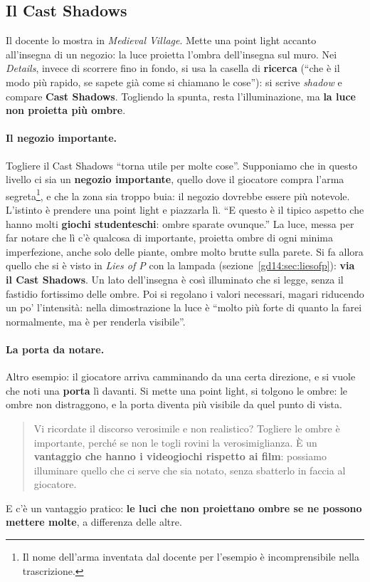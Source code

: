\subsection{Il Cast Shadows}

Il docente lo mostra in \emph{Medieval Village}. Mette una point light accanto
all'insegna di un negozio: la luce proietta l'ombra dell'insegna sul muro. Nei
\emph{Details}, invece di scorrere fino in fondo, si usa la casella di
\textbf{ricerca} (``che è il modo più rapido, se sapete già come si chiamano le
cose''): si scrive \emph{shadow} e compare \textbf{Cast Shadows}. Togliendo la
spunta, resta l'illuminazione, ma \textbf{la luce non proietta più ombre}.

\paragraph{Il negozio importante.} Togliere il Cast Shadows ``torna utile per molte
cose''. Supponiamo che in questo livello ci sia un \textbf{negozio importante}, quello
dove il giocatore compra l'arma segreta\footnote{Il nome dell'arma inventata dal
docente per l'esempio è incomprensibile nella trascrizione.}, e che la zona sia
troppo buia: il negozio dovrebbe essere più notevole. L'istinto è prendere una point
light e piazzarla lì. ``E questo è il tipico aspetto che hanno molti \textbf{giochi
studenteschi}: ombre sparate ovunque.'' La luce, messa per far notare che lì c'è
qualcosa di importante, proietta ombre di ogni minima imperfezione, anche solo
delle piante, ombre molto brutte sulla parete. Si fa allora quello che si è visto in
\emph{Lies of P} con la lampada (sezione~\ref{gd14:sec:liesofp}): \textbf{via il Cast
Shadows}. Un lato dell'insegna è così illuminato che si legge, senza il fastidio
fortissimo delle ombre. Poi si regolano i valori necessari, magari riducendo un po'
l'intensità: nella dimostrazione la luce è ``molto più forte di quanto la farei
normalmente, ma è per renderla visibile''.

\paragraph{La porta da notare.} Altro esempio: il giocatore arriva camminando da una
certa direzione, e si vuole che noti una \textbf{porta} lì davanti. Si mette una point
light, si tolgono le ombre: le ombre non distraggono, e la porta diventa più
visibile da quel punto di vista.
\begin{quote}
Vi ricordate il discorso verosimile e non realistico? Togliere le ombre è
importante, perché se non le togli rovini la verosimiglianza. È un
\textbf{vantaggio che hanno i videogiochi rispetto ai film}: possiamo illuminare
quello che ci serve che sia notato, senza sbatterlo in faccia al giocatore.
\end{quote}
E c'è un vantaggio pratico: \textbf{le luci che non proiettano ombre se ne possono
mettere molte}, a differenza delle altre.

